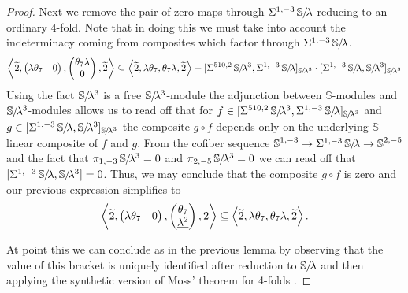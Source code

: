 \begin{proof}
  Next we remove the pair of zero maps through $\Sigma^{1,-3}\operatorname{\mathbb{S}}\hspace{-2.2pt}/\!\lambda$ reducing to an ordinary 4-fold.
  Note that in doing this we must take into account the indeterminacy coming from composites which factor through $\Sigma^{1,-3}\operatorname{\mathbb{S}}\hspace{-2.2pt}/\!\lambda$.
  \[ \left\langle \wt{2}, \begin{pmatrix} \lambda \theta_7 & 0 \end{pmatrix}, \begin{pmatrix} \theta_7\lambda \\ 0 \end{pmatrix}, \wt{2} \right\rangle \subseteq \left\langle \wt{2}, \lambda \theta_7 , \theta_7\lambda , \wt{2} \right\rangle + [\Sigma^{510,2} \clambda^3, \Sigma^{1,-3} \clambda]_{\clambda^3} \cdot [\Sigma^{1,-3} \clambda, \clambda^3]_{\clambda^3} \]
  Using the fact $\operatorname{\mathbb{S}}\hspace{-2.2pt}/\!\lambda^3$ is a free $\operatorname{\mathbb{S}}\hspace{-2.2pt}/\!\lambda^3$-module the adjunction between $\mathbb{S}$-modules and $\operatorname{\mathbb{S}}\hspace{-2.2pt}/\!\lambda^3$-modules allows us to read off that for $f \in [\Sigma^{510,2} \operatorname{\mathbb{S}}\hspace{-2.2pt}/\!\lambda^3, \Sigma^{1,-3} \operatorname{\mathbb{S}}\hspace{-2.2pt}/\!\lambda]_{\operatorname{\mathbb{S}}\hspace{-2.2pt}/\!\lambda^3}$ and $g \in [\Sigma^{1,-3} \operatorname{\mathbb{S}}\hspace{-2.2pt}/\!\lambda, \operatorname{\mathbb{S}}\hspace{-2.2pt}/\!\lambda^3]_{\operatorname{\mathbb{S}}\hspace{-2.2pt}/\!\lambda^3}$ the composite $g \circ f$ depends only on the underlying $\mathbb{S}$-linear composite of $f$ and $g$. 
  From the cofiber sequence 
  $\operatorname{\mathbb{S}}^{1,-3} \to \Sigma^{1,-3}\operatorname{\mathbb{S}}\hspace{-2.2pt}/\!\lambda \to \operatorname{\mathbb{S}}^{2,-5}$
  and the fact that $\pi_{1,-3}\operatorname{\mathbb{S}}\hspace{-2.2pt}/\!\lambda^3 = 0$ and $\pi_{2,-5}\operatorname{\mathbb{S}}\hspace{-2.2pt}/\!\lambda^3 = 0$ we can read off that 
  $[\Sigma^{1,-3} \operatorname{\mathbb{S}}\hspace{-2.2pt}/\!\lambda, \operatorname{\mathbb{S}}\hspace{-2.2pt}/\!\lambda^3] = 0$.
  Thus, we may conclude that the composite $g \circ f$ is zero
  and our previous expression simplifies to
  \[ \left\langle \wt{2}, \begin{pmatrix} \lambda \theta_7 & 0 \end{pmatrix}, \begin{pmatrix} \theta_7 \\ \underline{\lambda^2} \end{pmatrix}, 2 \right\rangle \subseteq \left\langle \wt{2}, \lambda \theta_7 , \theta_7\lambda , \wt{2} \right\rangle.\]
  
  At point this we can conclude as in the previous lemma by observing that the value of this bracket is uniquely identified after reduction to $\operatorname{\mathbb{S}}\hspace{-2.2pt}/\!\lambda$ and then applying the synthetic version of Moss' theorem for 4-folds \cite{cookware}.
\end{proof}

